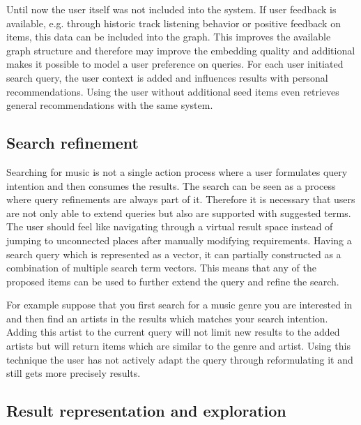\documentclass[sigconf]{acmart}
\begin{document}
Until now the user itself was not included into the system. If user feedback is available, e.g. through historic track listening behavior or positive feedback on items, this data can be included into the graph. This improves the available graph structure and therefore may improve the embedding quality and additional makes it possible to model a user preference on queries. For each user initiated search query, the user context is added and influences results with personal recommendations. Using the user without additional seed items even retrieves general recommendations with the same system.


\subsection{Search refinement}

Searching for music is not a single action process where a user formulates query intention and then consumes the results. The search can be seen as a process where query refinements are always part of it. Therefore it is necessary that users are not only able to extend queries but also are supported with suggested terms. The user should feel like navigating through a virtual result space instead of jumping to unconnected places after manually modifying requirements. Having a search query which is represented as a vector, it can partially constructed as a combination of multiple search term vectors. This means that any of the proposed items can be used to further extend the query and refine the search.

For example suppose that you first search for a music genre you are interested in and then find an artists in the results which matches your search intention. Adding this artist to the current query will not limit new results to the added artists but will return items which are similar to the genre and artist. Using this technique the user has not actively adapt the query through reformulating it and still gets more precisely results. \\

\subsection{Result representation and exploration}
\end{document}
